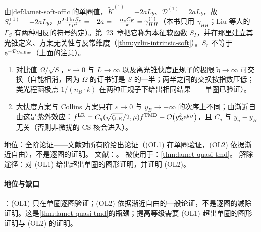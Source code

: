 由\cref{def:lamet-soft-offlc}的单圈值，$\tilde K^{(1)}=-2aL_b$、$\mathcal D^{(1)}=2aL_b$，故 $S_r^{(1)}=-2aL_b$，$\mu^2\frac{\mathrm{d}\ln S_r}{\mathrm{d}\mu^2}=-2a=-\frac{\alpha_s C_F}\pi=\gamma^{(1)}_{HH}$（本书只用 $\gamma_{HH}$；Liu 等人的 $\Gamma_S$ 有两种相反的符号约定）。第~23~章把它称为本征软函数 $S_I$，并在那里建立其光锥定义、方案无关性与反常维度（\cref{thm:yzliu-intrinsic-soft}）。$S_r$ 不等于 $\mathrm{e}^{-\mathcal D_{\rm Collins}}$（上面的注意）。

\begin{assumption}\label{asm:lamet-order-limits}
\begin{enumerate}[label=(OL\arabic*),leftmargin=3.2em,itemsep=1pt,topsep=2pt]
\item 对比值 $\Omega/\sqrt S$，$\varepsilon\to0$ 与 $L\to\infty$ 以及离光锥快度正规子的极限 $\tilde\eta\to\infty$ 可交换（自能相消，因为 $\Omega$ 的订书钉是 $S$ 的一半；两半之间的交换按指数压低；类光程函极点 $1/(n_B\cdot k)$ 在两种正规子下给出相同结果——单圈已验证）。
\item 大快度方案与 Collins 方案只在 $\varepsilon\to0$ 与 $y_B\to-\infty$ 的次序上不同；由渐近自由这是紫外效应：$f^{\rm LR}=C_q(\sqrt{\zeta_{\rm LR}}/2,\mu)f^{\rm TMD}+\mathcal{O}\!\left(y_B^k\mathrm{e}^{y_B}\right)$，且 $C_q$ 与 $y_n-y_B$ 无关（否则非微扰的 CS 核会进入）。
\end{enumerate}
地位：全阶论证——文献\cite{Ebert:2022fmh}对所有阶给出论证（(OL1) 在单圈验证，(OL2) 依据渐近自由），不是逐图的证明。
文献：\cite{Ebert:2022fmh}。
被使用于：\cref{thm:lamet-quasi-tmd}。
解除途径：对 (OL1) 给出超出单圈的图形证明，并证明 (OL2)。
\end{assumption}

\paragraph{地位与缺口}
\tagA：(OL1) 只在单圈逐图验证；(OL2) 依据渐近自由的一般论证，不是逐图的减除证明\cite{Ebert:2022fmh}。这是\cref{thm:lamet-quasi-tmd}的瓶颈；提高等级需要 (OL1) 超出单圈的图形证明与 (OL2) 的证明。

